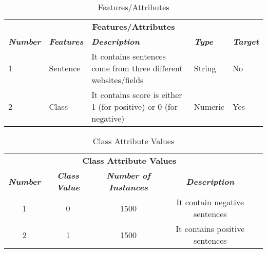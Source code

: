 \documentclass{article}
\begin{document}
\begin{table}[htbp]
\caption{Features/Attributes}
\begin{center}
\begin{tabular}{|m{5em}|m{5em}|m{15em}|m{5em}|m{5em}|}
\hline
\multicolumn{5}{|c|}{\textbf{Features/Attributes}} \\
\cline{1-5} 
\textbf{\textit{Number}}&
\textbf{\textit{Features}}&
\textbf{\textit{Description}}&
\textbf{\textit{Type}}&
\textbf{\textit{Target}}\\
\hline
1 & Sentence & It contains sentences come  from three different websites/fields & String & No\\
\hline
2 & Class & It contains score is either 1 (for positive) or 0 (for negative) & Numeric & Yes \\
\hline

\end{tabular}
\label{tab1}
\end{center}
\end{table}


\begin{table}[htbp]
\caption{Class Attribute Values}
\begin{center}
\begin{tabular}{|c|c|c|c|c|}
\hline
\multicolumn{4}{|c|}{\textbf{Class Attribute Values}} \\
\cline{1-4} 
\textbf{\textit{Number}}&
\textbf{\textit{Class Value}}&
\textbf{\textit{Number of Instances}}&
\textbf{\textit{Description}}\\
\hline
1 & 0 & 1500 & It contain negative   sentences \\
\hline
2 & 1 & 1500 & It contains positive sentences \\
\hline

\end{tabular}
\label{tab1}
\end{center}
\end{table}
\end{document}
